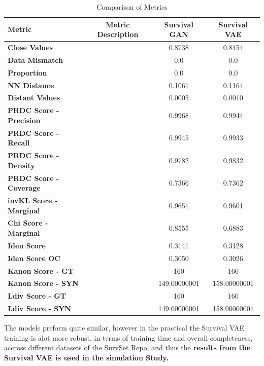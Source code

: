 \begin{table}[H]
    \centering
    \begin{tabular}{|l|c|c|c|}
    \hline
    \textbf{Metric}                & \textbf{Metric Description} & \textbf{Survival GAN} & \textbf{Survival VAE} \\ \hline
    \textbf{Close Values}          & & 0.8738           & 0.8454           \\ \hline
    \textbf{Data Mismatch}         & & 0.0              & 0.0              \\ \hline
    \textbf{Proportion}            & & 0.0              & 0.0              \\ \hline
    \textbf{NN Distance}           & & 0.1061           & 0.1164           \\ \hline
    \textbf{Distant Values}        & & 0.0005           & 0.0010           \\ \hline
    \textbf{PRDC Score - Precision}&  & 0.9968           & 0.9944           \\ \hline
    \textbf{PRDC Score - Recall}   &  & 0.9945           & 0.9933           \\ \hline
    \textbf{PRDC Score - Density}  &  & 0.9782           & 0.9832           \\ \hline
    \textbf{PRDC Score - Coverage} &  & 0.7366           & 0.7362           \\ \hline
    \textbf{invKL Score - Marginal}&  & 0.9651           & 0.9601           \\ \hline
    \textbf{Chi Score - Marginal}  &  & 0.8555           & 0.6883           \\ \hline
    \textbf{Iden Score}            &  & 0.3141           & 0.3128           \\ \hline
    \textbf{Iden Score OC}         &  & 0.3050           & 0.3026           \\ \hline
    \textbf{Kanon Score - GT}      &  & 160              & 160              \\ \hline
    \textbf{Kanon Score - SYN}     &  & 149.00000001     & 158.00000001     \\ \hline
    \textbf{Ldiv Score - GT}       &  & 160              & 160              \\ \hline
    \textbf{Ldiv Score - SYN}      &  & 149.00000001     & 158.00000001     \\ \hline
    \end{tabular}
    \caption{Comparison of Metrics}
    \label{tab:metrics_comparison}
\end{table}
\noindent The models preform quite similar, however in the practical the Survival VAE training is alot more robust, in terms of training time and overall completeness, accross different datasets of the SurvSet Repo, and thus the \textbf{results from the Survival VAE is used in the simulation Study.}
\clearpage
